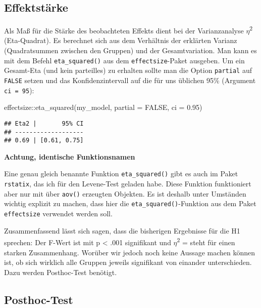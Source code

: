 \documentclass[
]{book}
\newenvironment{Shaded}{\begin{snugshade}}{\end{snugshade}}
\newcommand{\AttributeTok}[1]{\textcolor[rgb]{0.77,0.63,0.00}{#1}}
\newcommand{\ConstantTok}[1]{\textcolor[rgb]{0.00,0.00,0.00}{#1}}
\newcommand{\FloatTok}[1]{\textcolor[rgb]{0.00,0.00,0.81}{#1}}
\newcommand{\FunctionTok}[1]{\textcolor[rgb]{0.00,0.00,0.00}{#1}}
\newcommand{\NormalTok}[1]{#1}
\newcommand{\SpecialCharTok}[1]{\textcolor[rgb]{0.00,0.00,0.00}{#1}}
\begin{document}
\hypertarget{effektstuxe4rke}{%
\subsection{Effektstärke}\label{effektstuxe4rke}}

Als Maß für die Stärke des beobachteten Effekts dient bei der Varianzanalyse \(\eta\)\textsuperscript{2} (Eta-Quadrat). Es berechnet sich aus dem Verhältnis der erklärten Varianz (Quadratsummen zwischen den Gruppen) und der Gesamtvariation. Man kann es mit dem Befehl \texttt{eta\_squared()} aus dem \texttt{effectsize}-Paket ausgeben. Um ein Gesamt-Eta (und kein parteilles) zu erhalten sollte man die Option \texttt{partial} auf \texttt{FALSE} setzen und das Konfidenzintervall auf die für uns üblichen 95\% (Argument \texttt{ci\ =\ 95}):

\begin{Shaded}
\begin{Highlighting}[]
\NormalTok{effectsize}\SpecialCharTok{::}\FunctionTok{eta\_squared}\NormalTok{(my\_model, }
                        \AttributeTok{partial =} \ConstantTok{FALSE}\NormalTok{, }
                        \AttributeTok{ci =} \FloatTok{0.95}\NormalTok{) }
\end{Highlighting}
\end{Shaded}

\begin{verbatim}
## Eta2 |       95% CI
## -------------------
## 0.69 | [0.61, 0.75]
\end{verbatim}

\leavevmode\hypertarget{info_levenef}{}%
\textbf{Achtung, identische Funktionsnamen}

Eine genau gleich benannte Funktion \texttt{eta\_squared()} gibt es auch im Paket \texttt{rstatix}, das ich für den Levene-Test geladen habe. Diese Funktion funktioniert aber nur mit über \texttt{aov()} erzeugten Objekten. Es ist deshalb unter Umständen wichtig explizit zu machen, dass hier die \texttt{eta\_squared()}-Funktion aus dem Paket \texttt{effectsize} verwendet werden soll.

Zusammenfassend lässt sich sagen, dass die bisherigen Ergebnisse für die H1 sprechen: Der F-Wert ist mit p \textless{} .001 signifikant und \(\eta\)\textsuperscript{2} =  steht für einen starken Zusammenhang. Worüber wir jedoch noch keine Aussage machen können ist, ob sich wirklich alle Gruppen jeweils signifikant von einander unterschieden. Dazu werden Posthoc-Test benötigt.

\hypertarget{posthoc-test}{%
\subsection{Posthoc-Test}\label{posthoc-test}}
\end{document}
